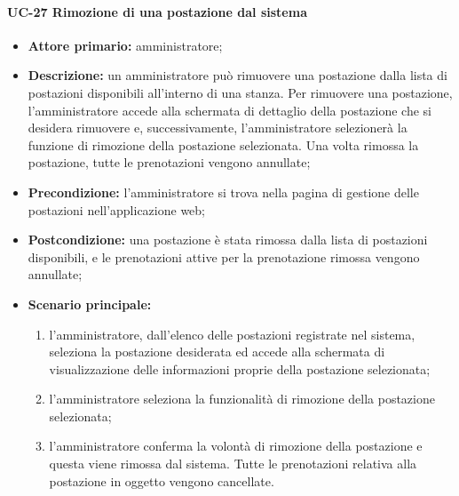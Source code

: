 \paragraph{UC-27 Rimozione di una postazione dal sistema}
\begin{itemize}
    \item \textbf{Attore primario:} amministratore;
    \item \textbf{Descrizione:} un amministratore pu\`{o} rimuovere una postazione dalla lista di postazioni disponibili all'interno di una stanza. Per rimuovere una postazione, l'amministratore accede alla schermata di dettaglio della postazione che si desidera rimuovere e, successivamente, l'amministratore selezionerà la funzione di rimozione della postazione selezionata. Una volta rimossa la postazione, tutte le prenotazioni vengono annullate;
    \item \textbf{Precondizione:} l'amministratore si trova nella pagina di gestione delle postazioni nell'applicazione web;
    \item \textbf{Postcondizione:} una postazione \`{e} stata rimossa dalla lista di postazioni disponibili, e le prenotazioni attive per la prenotazione rimossa vengono annullate;
    \item \textbf{Scenario principale:}
    \begin{enumerate}
        \item l'amministratore, dall'elenco delle postazioni registrate nel sistema, seleziona la postazione desiderata ed accede alla schermata di visualizzazione delle informazioni proprie della postazione selezionata;
        \item l'amministratore seleziona la funzionalità di rimozione della postazione selezionata;
        \item l'amministratore conferma la volontà di rimozione della postazione e questa viene rimossa dal sistema. Tutte le prenotazioni relativa alla postazione in oggetto vengono cancellate.
    \end{enumerate}
\end{itemize}

